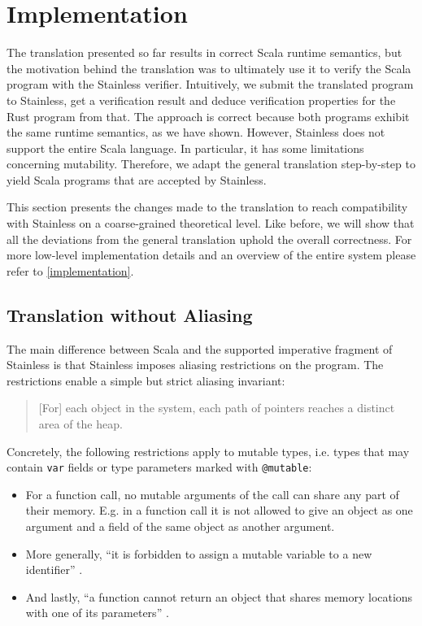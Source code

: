 \section{Implementation}

The translation presented so far results in correct Scala runtime semantics, but
the motivation behind the translation was to ultimately use it to verify the
Scala program with the Stainless verifier. Intuitively, we submit the translated
program to Stainless, get a verification result and deduce verification
properties for the Rust program from that. The approach is correct because both
programs exhibit the same runtime semantics, as we have shown. However,
Stainless does not support the entire Scala language. In particular, it has some
limitations concerning mutability. Therefore, we adapt the general translation
step-by-step to yield Scala programs that are accepted by Stainless.

This section presents the changes made to the translation to reach compatibility
with Stainless on a coarse-grained theoretical level. Like before, we will show
that all the deviations from the general translation uphold the overall
correctness. For more low-level implementation details and an overview of the
entire system please refer to \autoref{implementation}.




\subsection{Translation without Aliasing}
\label{sec:aliasing-restrictions}

The main difference between Scala and the supported imperative fragment of
Stainless \cite[section "Imperative"]{stainless-doc} is that Stainless imposes
aliasing restrictions on the program. The restrictions enable a simple but
strict aliasing invariant:

\begin{quote}
{[}For{]} each object in the system, each path of pointers reaches a
distinct area of the heap. \cite[p.~59]{regb}
\end{quote}

Concretely, the following restrictions apply to mutable types, i.e. types that
may contain \lstinline!var! fields or type parameters marked with
\lstinline!@mutable!:

\begin{itemize}
\tightlist
\item
  For a function call, no mutable arguments of the call can share any
  part of their memory. E.g. in a function call it is not allowed to
  give an object as one argument and a field of the same object as
  another argument.
\item
  More generally, ``it is forbidden to assign a mutable variable to a
  new identifier'' \cite[p.~59]{regb}.
\item
  And lastly, ``a function cannot return an object that shares memory
  locations with one of its parameters'' \cite[p.~59]{regb}.
\end{itemize}

